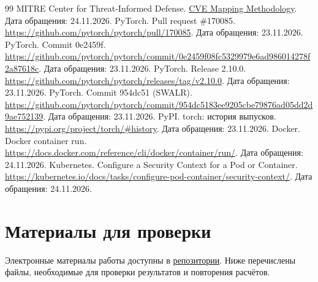 \documentclass[12pt,a4paper]{report}
\begin{document}
\begin{thebibliography}{99}
 MITRE Center for Threat-Informed Defense. \href{https://ctid.mitre.org/mappings/about/methodology/cve-methodology/}{CVE Mapping Methodology}. Дата обращения: 24.11.2026.
 PyTorch. Pull request \#170085. \url{https://github.com/pytorch/pytorch/pull/170085}. Дата обращения: 23.11.2026.
 PyTorch. Commit 0e2459f. \url{https://github.com/pytorch/pytorch/commit/0e2459f08fc5329979e6ad986014278f2a87618c}. Дата обращения: 23.11.2026.
 PyTorch. Release 2.10.0. \url{https://github.com/pytorch/pytorch/releases/tag/v2.10.0}. Дата обращения: 23.11.2026.
 PyTorch. Commit 954dc51 (SWALR). \url{https://github.com/pytorch/pytorch/commit/954dc5183ee9205cbe79876ad05dd2d9ae752139}. Дата обращения: 23.11.2026.
 PyPI. torch: история выпусков. \url{https://pypi.org/project/torch/#history}. Дата обращения: 23.11.2026.
 Docker. Docker container run. \url{https://docs.docker.com/reference/cli/docker/container/run/}. Дата обращения: 24.11.2026.
 Kubernetes. Configure a Security Context for a Pod or Container. \url{https://kubernetes.io/docs/tasks/configure-pod-container/security-context/}. Дата обращения: 24.11.2026.
\end{thebibliography}

\appendix
\chapter{Материалы для проверки}

Электронные материалы работы доступны в \href{https://github.com/quiner1793/HSE-Cybersecurity-Programming-Work1}{репозитории}.
Ниже перечислены файлы, необходимые для проверки результатов и повторения расчётов.
\end{document}

